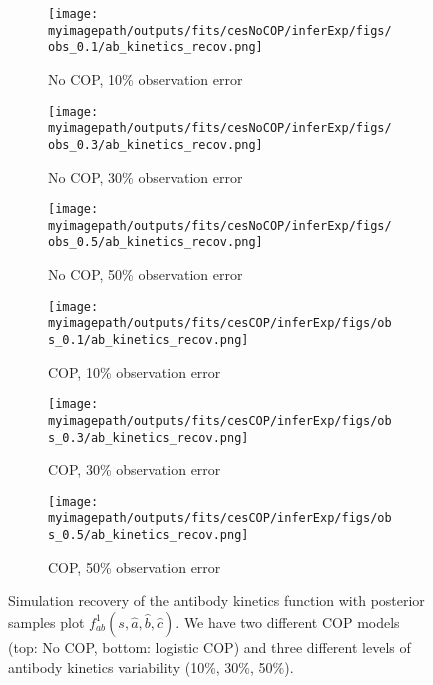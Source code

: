 \begin{figure}[H]

    \centering
    \begin{subfigure}{0.31\textwidth}
        \centering
        \texttt{[image: \\myimagepath/outputs/fits/cesNoCOP/inferExp/figs/obs\_0.1/ab\_kinetics\_recov.png]}
        \caption{No COP, 10\% observation error}
    \end{subfigure}
    \begin{subfigure}{0.31\textwidth}
        \centering
        \texttt{[image: \\myimagepath/outputs/fits/cesNoCOP/inferExp/figs/obs\_0.3/ab\_kinetics\_recov.png]}
        \caption{No COP, 30\% observation error}
    \end{subfigure}
    \begin{subfigure}{0.31\textwidth}
        \centering
        \texttt{[image: \\myimagepath/outputs/fits/cesNoCOP/inferExp/figs/obs\_0.5/ab\_kinetics\_recov.png]}
        \caption{No COP, 50\% observation error}
    \end{subfigure}
    
  \begin{subfigure}{0.31\textwidth}
        \centering
        \texttt{[image: \\myimagepath/outputs/fits/cesCOP/inferExp/figs/obs\_0.1/ab\_kinetics\_recov.png]}
        \caption{ COP, 10\% observation error}
    \end{subfigure}
    \begin{subfigure}{0.31\textwidth}
        \centering
        \texttt{[image: \\myimagepath/outputs/fits/cesCOP/inferExp/figs/obs\_0.3/ab\_kinetics\_recov.png]}
        \caption{ COP, 30\% observation error}
    \end{subfigure}
    \begin{subfigure}{0.31\textwidth}
        \centering
        \texttt{[image: \\myimagepath/outputs/fits/cesCOP/inferExp/figs/obs\_0.5/ab\_kinetics\_recov.png]}
        \caption{ COP, 50\% observation error}
    \end{subfigure}
    
    \caption{Simulation recovery of the antibody kinetics function with posterior samples plot $f^1_{ab}(s, \hat{a}, \hat{b}, \hat{c})$. We have two different COP models (top: No COP, bottom: logistic COP) and three different levels of antibody kinetics variability (10\%, 30\%, 50\%). \label{fit2:ab}}
   \end{figure}

